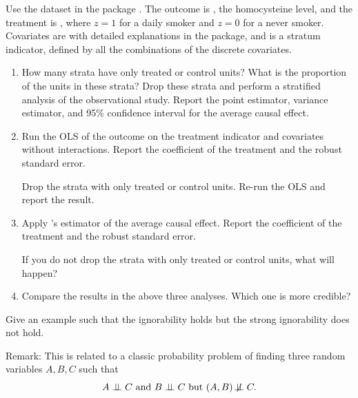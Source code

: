 \begin{HomeworkProblem}\label{exr:10-4}

Use the dataset  in the package .
The outcome is , the homocysteine level, and the treatment is , where $z=1$ for a daily smoker and $z=0$ for a never smoker. Covariates are  with detailed explanations in the package, and  is a stratum indicator, defined by all the combinations of the discrete covariates.


\begin{enumerate}
[(1)]
\item
How many strata have only treated or control units? What is the proportion of the units in these strata? Drop these strata and perform a stratified analysis of the observational study. Report the point estimator, variance estimator, and 95\% confidence interval for the average causal effect.

\item
Run the OLS of the outcome on the treatment indicator and covariates without interactions. Report the coefficient of the treatment and the robust standard error.

Drop the strata with only treated or control units. Re-run the OLS and report the result.


\item
Apply \citet{lin2013}'s estimator of the average causal effect. Report the coefficient of the treatment and the robust standard error.

If you do not drop the strata with only treated or control units, what will happen?


\item
Compare the results in the above three analyses. Which one is more credible?

\end{enumerate}



\end{HomeworkProblem}

\begin{HomeworkProblem}\label{exr:10-5}


Give an example such that the ignorability holds but the strong ignorability does not hold.


Remark: This is related to a classic probability problem of finding three random variables $A,B,C$ such that
\[
A\ind C \text{ and } B\ind C \text{ but } (A,B) \nind C.
\]


\end{HomeworkProblem}

